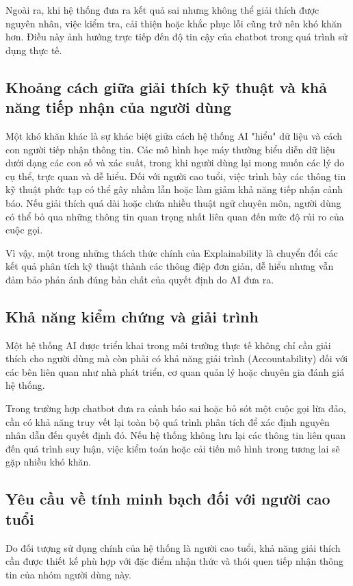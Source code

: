 Ngoài ra, khi hệ thống đưa ra kết quả sai nhưng không thể giải thích được nguyên nhân, việc kiểm tra, cải thiện hoặc khắc phục lỗi cũng trở nên khó khăn hơn. Điều này ảnh hưởng trực tiếp đến độ tin cậy của chatbot trong quá trình sử dụng thực tế.

\subsection{Khoảng cách giữa giải thích kỹ thuật và khả năng tiếp nhận của người dùng}
Một khó khăn khác là sự khác biệt giữa cách hệ thống AI "hiểu" dữ liệu và cách con người tiếp nhận thông tin. Các mô hình học máy thường biểu diễn dữ liệu dưới dạng các con số và xác suất, trong khi người dùng lại mong muốn các lý do cụ thể, trực quan và dễ hiểu.
Đối với người cao tuổi, việc trình bày các thông tin kỹ thuật phức tạp có thể gây nhầm lẫn hoặc làm giảm khả năng tiếp nhận cảnh báo. Nếu giải thích quá dài hoặc chứa nhiều thuật ngữ chuyên môn, người dùng có thể bỏ qua những thông tin quan trọng nhất liên quan đến mức độ rủi ro của cuộc gọi.

Vì vậy, một trong những thách thức chính của Explainability là chuyển đổi các kết quả phân tích kỹ thuật thành các thông điệp đơn giản, dễ hiểu nhưng vẫn đảm bảo phản ánh đúng bản chất của quyết định do AI đưa ra.

\subsection{Khả năng kiểm chứng và giải trình}
Một hệ thống AI được triển khai trong môi trường thực tế không chỉ cần giải thích cho người dùng mà còn phải có khả năng giải trình (Accountability) đối với các bên liên quan như nhà phát triển, cơ quan quản lý hoặc chuyên gia đánh giá hệ thống.

Trong trường hợp chatbot đưa ra cảnh báo sai hoặc bỏ sót một cuộc gọi lừa đảo, cần có khả năng truy vết lại toàn bộ quá trình phân tích để xác định nguyên nhân dẫn đến quyết định đó. Nếu hệ thống không lưu lại các thông tin liên quan đến quá trình suy luận, việc kiểm toán hoặc cải tiến mô hình trong tương lai sẽ gặp nhiều khó khăn.

\subsection{Yêu cầu về tính minh bạch đối với người cao tuổi}
Do đối tượng sử dụng chính của hệ thống là người cao tuổi, khả năng giải thích cần được thiết kế phù hợp với đặc điểm nhận thức và thói quen tiếp nhận thông tin của nhóm người dùng này.

